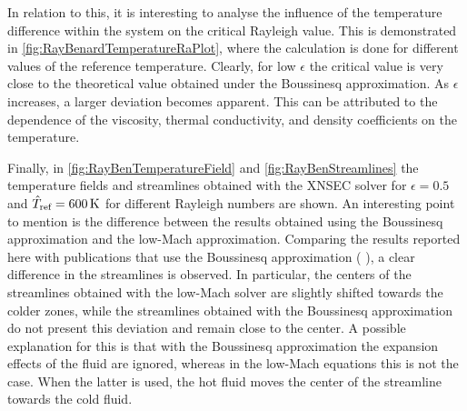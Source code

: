 In relation to this, it is interesting to analyse the influence of the temperature difference within the system on the critical Rayleigh value. This is demonstrated in \cref{fig:RayBenardTemperatureRaPlot}, where the calculation is done for different values of the reference temperature. Clearly, for low $\epsilon$  the critical value is very close to the theoretical value obtained under the Boussinesq approximation. As $\epsilon$ increases, a larger deviation becomes apparent. This can be attributed to the dependence of the viscosity, thermal conductivity, and density coefficients on the temperature. 

Finally, in \cref{fig:RayBenTemperatureField} and \cref{fig:RayBenStreamlines} the temperature fields and streamlines obtained with the XNSEC solver for $\epsilon = 0.5$ and $\hat T_{\text{ref}} = \SI{600}{\kelvin}$ for different Rayleigh numbers are shown. An interesting point to mention is the difference between the results obtained using the Boussinesq approximation and the low-Mach approximation. Comparing the results reported here with publications that use the Boussinesq approximation ( \textcite{shishkinaRayleighBenardConvectionContainer2021,zhouNumericalSimulationLaminar2004}), a clear difference in the streamlines is observed. In particular, the centers of the streamlines obtained with the low-Mach solver are slightly shifted towards the colder zones, while the streamlines obtained with the Boussinesq approximation do not present this deviation and remain close to the center. A possible explanation for this is that with the Boussinesq approximation the expansion effects of the fluid are ignored, whereas in the low-Mach equations this is not the case. When the latter is used, the hot fluid moves the center of the streamline towards the cold fluid.
